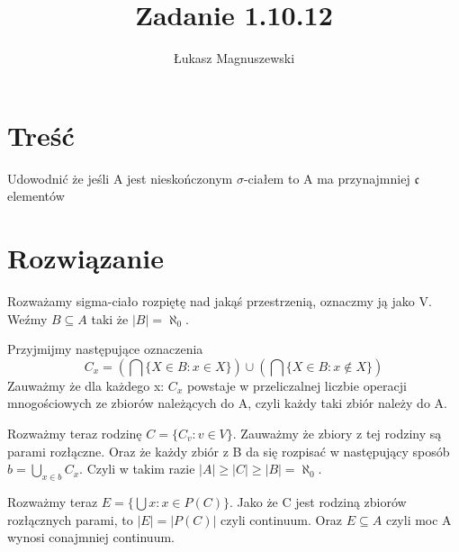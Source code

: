 \documentclass{article}
\title{Zadanie 1.10.12}
\author{Łukasz Magnuszewski}
\date{\vspace{-5ex}}
\begin{document}
\maketitle
\section*{Treść}
Udowodnić że jeśli A jest nieskończonym $\sigma$-ciałem to A ma przynajmniej  $\mathfrak{c}$
elementów
\section{Rozwiązanie} 
Rozważamy sigma-ciało rozpiętę nad jakąś przestrzenią, oznaczmy ją jako V.
Weźmy $B \subseteq A$ taki że $|B| = \aleph_0$.

Przyjmijmy następujące oznaczenia 
\[ 
    C_x = (\bigcap \{ X \in B : x \in X \})  \cup (\bigcap \{ X \in B : x \not\in X \})
\]
Zauważmy że dla każdego x: $C_x$ powstaje w przeliczalnej liczbie operacji mnogościowych ze zbiorów należących do A, czyli każdy taki zbiór należy do A.

Rozważmy teraz rodzinę $C = \{ C_v : v \in V\}$. Zauważmy że zbiory z tej rodziny są parami rozłączne. Oraz że każdy zbiór z B da się rozpisać w następujący sposób $b = \bigcup_{x \in b} C_x$. Czyli w takim razie $|A| \geq |C| \geq |B| = \aleph_0$.

Rozważmy teraz $E = \{ \bigcup x : x \in P(C) \} $. Jako że C jest rodziną zbiorów rozłącznych parami, to $|E| = |P(C)|$ czyli continuum. Oraz $E \subseteq A$ czyli moc A wynosi conajmniej continuum.
\end{document}
